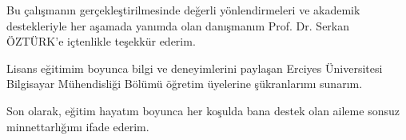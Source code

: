 Bu çalışmanın gerçekleştirilmesinde değerli yönlendirmeleri ve akademik destekleriyle her aşamada yanımda olan danışmanım Prof. Dr. Serkan ÖZTÜRK'e içtenlikle teşekkür ederim.

Lisans eğitimim boyunca bilgi ve deneyimlerini paylaşan Erciyes Üniversitesi Bilgisayar Mühendisliği Bölümü öğretim üyelerine şükranlarımı sunarım.

Son olarak, eğitim hayatım boyunca her koşulda bana destek olan aileme sonsuz minnettarlığımı ifade ederim.
